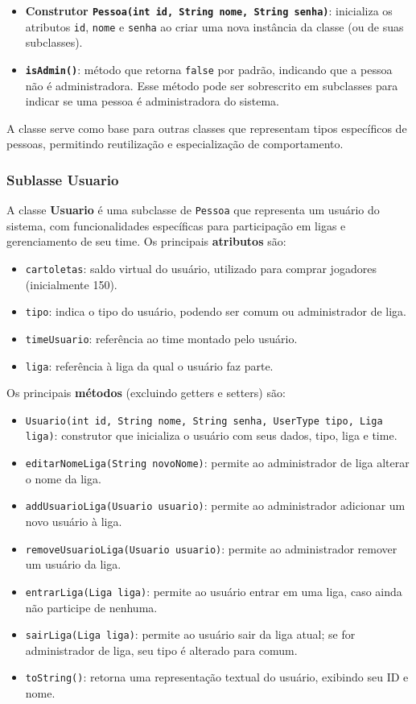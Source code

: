 \documentclass[12pt]{article}
\begin{document}
\begin{itemize}
  \item \textbf{Construtor \texttt{Pessoa(int id, String nome, String senha)}}: inicializa os atributos \texttt{id}, \texttt{nome} e \texttt{senha} ao criar uma nova instância da classe (ou de suas subclasses).
  \item \textbf{\texttt{isAdmin()}}: método que retorna \texttt{false} por padrão, indicando que a pessoa não é administradora. Esse método pode ser sobrescrito em subclasses para indicar se uma pessoa é administradora do sistema.
\end{itemize}

A classe serve como base para outras classes que representam tipos específicos de pessoas, permitindo reutilização e especialização de comportamento.

\subsubsection{Sublasse Usuario}

A classe \textbf{Usuario} é uma subclasse de \texttt{Pessoa} que representa um usuário do sistema, com funcionalidades específicas para participação em ligas e gerenciamento de seu time. Os principais \textbf{atributos} são:

\begin{itemize}
  \item \texttt{cartoletas}: saldo virtual do usuário, utilizado para comprar jogadores (inicialmente 150).
  \item \texttt{tipo}: indica o tipo do usuário, podendo ser comum ou administrador de liga.
  \item \texttt{timeUsuario}: referência ao time montado pelo usuário.
  \item \texttt{liga}: referência à liga da qual o usuário faz parte.
\end{itemize}

Os principais \textbf{métodos} (excluindo getters e setters) são:

\begin{itemize}
  \item \texttt{Usuario(int id, String nome, String senha, UserType tipo, Liga liga)}: construtor que inicializa o usuário com seus dados, tipo, liga e time.
  \item \texttt{editarNomeLiga(String novoNome)}: permite ao administrador de liga alterar o nome da liga.
  \item \texttt{addUsuarioLiga(Usuario usuario)}: permite ao administrador adicionar um novo usuário à liga.
  \item \texttt{removeUsuarioLiga(Usuario usuario)}: permite ao administrador remover um usuário da liga.
  \item \texttt{entrarLiga(Liga liga)}: permite ao usuário entrar em uma liga, caso ainda não participe de nenhuma.
  \item \texttt{sairLiga(Liga liga)}: permite ao usuário sair da liga atual; se for administrador de liga, seu tipo é alterado para comum.
  \item \texttt{toString()}: retorna uma representação textual do usuário, exibindo seu ID e nome.
\end{itemize}
\end{document}
